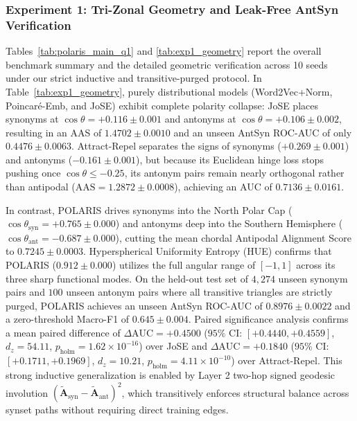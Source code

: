 \documentclass[journal]{IEEEtran}
\begin{document}
\subsubsection{Experiment 1: Tri-Zonal Geometry and Leak-Free AntSyn Verification}
Tables~\ref{tab:polaris_main_q1} and \ref{tab:exp1_geometry} report the overall benchmark summary and the detailed geometric verification across 10 seeds under our strict inductive and transitive-purged protocol. In Table~\ref{tab:exp1_geometry}, purely distributional models (Word2Vec+Norm, Poincar\'{e}-Emb, and JoSE) exhibit complete polarity collapse: JoSE places synonyms at $\cos\theta = +0.116 \pm 0.001$ and antonyms at $\cos\theta = +0.106 \pm 0.002$, resulting in an AAS of $1.4702 \pm 0.0010$ and an unseen AntSyn ROC-AUC of only $0.4476 \pm 0.0063$. Attract-Repel separates the signs of synonyms ($+0.269 \pm 0.001$) and antonyms ($-0.161 \pm 0.001$), but because its Euclidean hinge loss stops pushing once $\cos\theta \le -0.25$, its antonym pairs remain nearly orthogonal rather than antipodal ($\text{AAS} = 1.2872 \pm 0.0008$), achieving an AUC of $0.7136 \pm 0.0161$.

In contrast, POLARIS drives synonyms into the North Polar Cap ($\cos\theta_{\text{syn}} = +0.765 \pm 0.000$) and antonyms deep into the Southern Hemisphere ($\cos\theta_{\text{ant}} = -0.687 \pm 0.000$), cutting the mean chordal Antipodal Alignment Score to $0.7245 \pm 0.0003$. Hyperspherical Uniformity Entropy (HUE) confirms that POLARIS ($0.912 \pm 0.000$) utilizes the full angular range of $[-1, 1]$ across its three sharp functional modes. On the held-out test set of $4,274$ unseen synonym pairs and $100$ unseen antonym pairs where all transitive triangles are strictly purged, POLARIS achieves an unseen AntSyn ROC-AUC of $\mathbf{0.8976 \pm 0.0022}$ and a zero-threshold Macro-F1 of $0.645 \pm 0.004$. Paired significance analysis confirms a mean paired difference of $\Delta\text{AUC} = +0.4500$ ($95\%$ CI: $[+0.4440, +0.4559]$, $d_z = 54.11$, $p_{\text{holm}} = 1.62 \times 10^{-16}$) over JoSE and $\Delta\text{AUC} = +0.1840$ ($95\%$ CI: $[+0.1711, +0.1969]$, $d_z = 10.21$, $p_{\text{holm}} = 4.11 \times 10^{-10}$) over Attract-Repel. This strong inductive generalization is enabled by Layer 2 two-hop signed geodesic involution $(\tilde{\mathbf{A}}_{\text{syn}} - \tilde{\mathbf{A}}_{\text{ant}})^2$, which transitively enforces structural balance across synset paths without requiring direct training edges.
\end{document}
